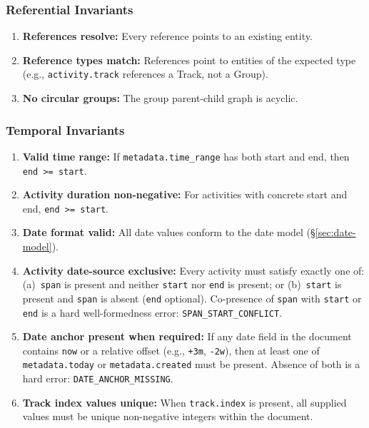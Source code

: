 \subsubsection{Referential Invariants}

\begin{enumerate}[resume]
  \item \textbf{References resolve:} Every reference points to an existing entity.
  \item \textbf{Reference types match:} References point to entities of the expected type
        (e.g., \texttt{activity.track} references a Track, not a Group).
  \item \textbf{No circular groups:} The group parent-child graph is acyclic.
\end{enumerate}

\subsubsection{Temporal Invariants}

\begin{enumerate}[resume]
  \item \textbf{Valid time range:} If \texttt{metadata.time\_range} has both start and end,
        then \texttt{end >= start}.
  \item \textbf{Activity duration non-negative:} For activities with concrete start and end,
        \texttt{end >= start}.
  \item \textbf{Date format valid:} All date values conform to the date model
        (\S\ref{sec:date-model}).
  \item \textbf{Activity date-source exclusive:} Every activity must satisfy exactly one of:
        (a)~\texttt{span} is present and neither \texttt{start} nor \texttt{end} is present; or
        (b)~\texttt{start} is present and \texttt{span} is absent (\texttt{end} optional).
        Co-presence of \texttt{span} with \texttt{start} or \texttt{end} is a hard
        well-formedness error: \texttt{SPAN\_START\_CONFLICT}.
  \item \textbf{Date anchor present when required:} If any date field in the document
        contains \texttt{now} or a relative offset (e.g., \texttt{+3m}, \texttt{-2w}),
        then at least one of \texttt{metadata.today} or \texttt{metadata.created} must be
        present. Absence of both is a hard error: \texttt{DATE\_ANCHOR\_MISSING}.
  \item \textbf{Track index values unique:} When \texttt{track.index} is present, all
        supplied values must be unique non-negative integers within the document.
\end{enumerate}

